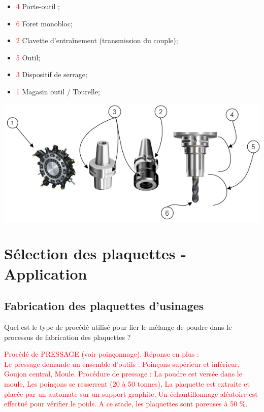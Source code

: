 \documentclass[12pt,a4paper]{article} %
\begin{document}
\begin{minipage}{.55\linewidth}
\begin{itemize}
    \item  \textcolor{red}{4} Porte-outil ;
    \item  \textcolor{red}{6} Foret monobloc;
    \item \textcolor{red}{2} Clavette d'entraînement (transmission du couple);
\end{itemize} 
\end{minipage}
\begin{minipage}{.44\linewidth}
\begin{itemize}
    \item  \textcolor{red}{5} Outil;
    \item \textcolor{red}{3} Dispositif de serrage;
    \item  \textcolor{red}{1} Magasin outil / Tourelle;
\end{itemize} 
\end{minipage}


\includegraphics[scale=0.95]{FF1.png}




\section{Sélection des plaquettes - Application}
\subsection{Fabrication des plaquettes d'usinages}

\begin{exo} Quel est le type de procédé utilisé pour lier le mélange de poudre dans le processus de fabrication des plaquettes ?\end{exo}

\textcolor{red}{Procédé de PRESSAGE (voir poinçonnage). Réponse en plus : \\
Le pressage demande un ensemble d'outils : Poinçons supérieur et inférieur, Goujon central, Moule. Procédure de pressage : La poudre est versée dans le moule, Les poinçons se resserrent (20 à 50 tonnes), La plaquette est extraite et placée par un automate sur un support graphite, Un échantillonnage aléatoire est effectué pour vérifier le poids. A ce stade, les plaquettes sont poreuses à 50 \%.}
\end{document}
